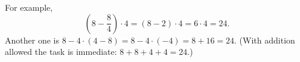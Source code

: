 For example,
\[
\boxed{\left(8-\dfrac{8}{4}\right)\cdot4}=(8-2)\cdot4=6\cdot4=24 .
\]
Another one is $8-4\cdot(4-8)=8-4\cdot(-4)=8+16=24$. (With addition allowed the task is immediate: $8+8+4+4=24$.)
